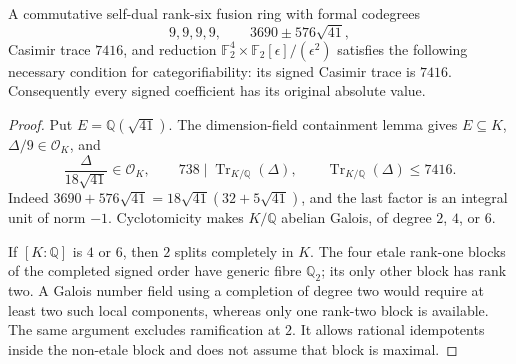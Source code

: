 \begin{proposition}\label{prop:split-41-profile}
A commutative self-dual rank-six fusion ring with formal codegrees
\[
 9,9,9,9,\qquad 3690\pm576\sqrt{41},
\]
Casimir trace $7416$, and reduction
$\mathbb F_2^4\times\mathbb F_2[\epsilon]/(\epsilon^2)$ satisfies the following
necessary condition for categorifiability: its signed Casimir trace is $7416$.
Consequently every signed coefficient has its original absolute value.
\end{proposition}
\begin{proof}
Put $E=\mathbb Q(\sqrt{41})$. The dimension-field containment lemma gives
$E\subseteq K$, $\Delta/9\in\mathcal O_K$, and
\[
 \frac{\Delta}{18\sqrt{41}}\in\mathcal O_K,
 \qquad 738\mid\operatorname{Tr}_{K/\mathbb Q}(\Delta),
 \qquad \operatorname{Tr}_{K/\mathbb Q}(\Delta)\le7416.
\]
Indeed $3690+576\sqrt{41}=18\sqrt{41}(32+5\sqrt{41})$, and the last factor
is an integral unit of norm $-1$. Cyclotomicity makes $K/\mathbb Q$
abelian Galois, of degree $2$, $4$, or $6$.

If $[K:\mathbb Q]$ is $4$ or $6$, then $2$ splits completely in $K$.
The four etale rank-one blocks of the completed signed order have generic
fibre $\mathbb Q_2$; its only other block has rank two. A Galois number
field using a completion of degree two would require at least two such
local components, whereas only one rank-two block is available. The same
argument excludes ramification at $2$. It allows rational idempotents
inside the non-etale block and does not assume that block is maximal.


\end{proof}
